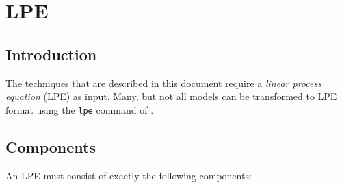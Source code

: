 \chapter{LPE}

\section{Introduction}
The techniques that are described in this document require a \emph{linear process equation} (LPE) as input.
Many, but not all models can be transformed to LPE format using the \texttt{lpe} command of \txs{}.

\section{Components}

An LPE must consist of exactly the following components:

